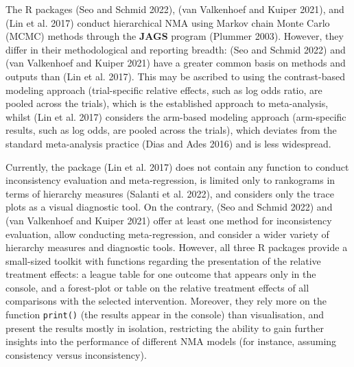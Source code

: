 The R packages  (Seo and Schmid 2022),  (van Valkenhoef and Kuiper 2021), and 
(Lin et al. 2017) conduct hierarchical NMA using Markov chain Monte Carlo (MCMC) methods
through the \textbf{JAGS} program (Plummer 2003). However, they differ in their
methodological and reporting breadth:  (Seo and Schmid 2022)
and  (van Valkenhoef and Kuiper 2021) have a greater common basis on methods and outputs
than  (Lin et al. 2017). This may be ascribed to using the contrast-based
modeling approach (trial-specific relative effects, such as log odds ratio, are
pooled across the trials), which is the established approach to meta-analysis, whilst
 (Lin et al. 2017) considers the arm-based modeling approach
(arm-specific results, such as log odds, are pooled across the trials), which
deviates from the standard meta-analysis practice (Dias and Ades 2016) and is less widespread.

Currently, the package  (Lin et al. 2017) does not contain any
function to conduct inconsistency evaluation and meta-regression, is limited only
to rankograms in terms of hierarchy measures (Salanti et al. 2022), and considers only
the trace plots as a visual diagnostic tool. On the contrary,  (Seo and Schmid 2022)
and  (van Valkenhoef and Kuiper 2021) offer at least one method for inconsistency evaluation,
allow conducting meta-regression, and consider a wider variety of hierarchy measures
and diagnostic tools. However, all three R packages provide a small-sized toolkit
with functions regarding the presentation of the relative treatment effects: a league
table for one outcome that appears only in the console, and a forest-plot or table
on the relative treatment effects of all comparisons with the selected intervention.
Moreover, they rely more on the function \texttt{print()} (the results appear in the
console) than visualisation, and present the results mostly in isolation, restricting
the ability to gain further insights into the performance of different NMA models
(for instance, assuming consistency versus inconsistency).

